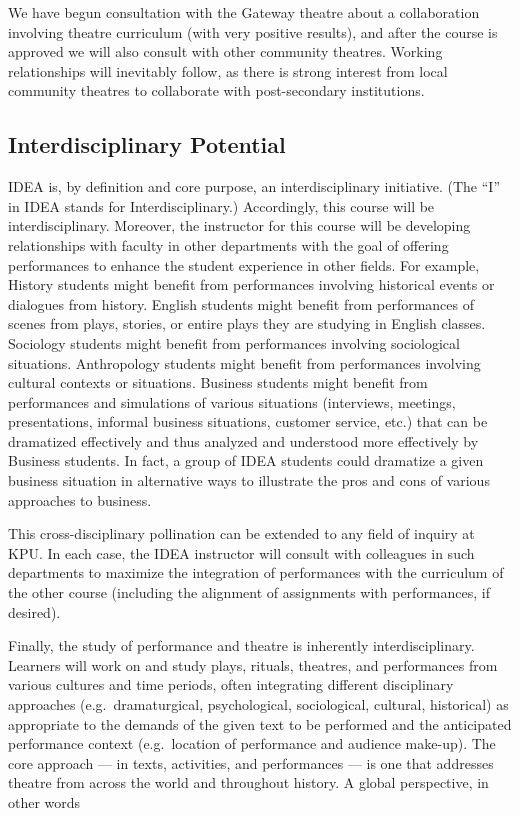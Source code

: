 \documentclass[letterpaper,10pt,headsepline]{scrreprt}
\begin{document}
We have begun consultation with the Gateway theatre about a
collaboration involving theatre curriculum (with very positive results),
and after the course is approved we will also consult with other
community theatres. Working relationships will inevitably follow, as
there is strong interest from local community theatres to collaborate
with post-secondary institutions.

\subsection{Interdisciplinary Potential}

IDEA is, by definition and core purpose, an interdisciplinary
initiative. (The ``I'' in IDEA stands for Interdisciplinary.)
Accordingly, this course will be interdisciplinary. Moreover, the
instructor for this course will be developing relationships with faculty
in other departments with the goal of offering performances to enhance
the student experience in other fields. For example, History students
might benefit from performances involving historical events or dialogues
from history. English students might benefit from performances of scenes
from plays, stories, or entire plays they are studying in English
classes. Sociology students might benefit from performances involving
sociological situations. Anthropology students might benefit from
performances involving cultural contexts or situations. Business
students might benefit from performances and simulations of various
situations (interviews, meetings, presentations, informal business
situations, customer service, etc.) that can be dramatized effectively
and thus analyzed and understood more effectively by Business students.
In fact, a group of IDEA students could dramatize a given business
situation in alternative ways to illustrate the pros and cons of various
approaches to business.

This cross-disciplinary pollination can be extended to any field of
inquiry at KPU. In each case, the IDEA instructor will consult with
colleagues in such departments to maximize the integration of
performances with the curriculum of the other course (including the
alignment of assignments with performances, if desired).

Finally, the study of performance and theatre is inherently
interdisciplinary. Learners will work on and study plays, rituals,
theatres, and performances from various cultures and time periods, often
integrating different disciplinary approaches (e.g.~dramaturgical,
psychological, sociological, cultural, historical) as appropriate to the
demands of the given text to be performed and the anticipated
performance context (e.g.~location of performance and audience make-up).
The core approach --- in texts, activities, and performances --- is one
that addresses theatre from across the world and throughout history. A
global perspective, in other words
\end{document}
